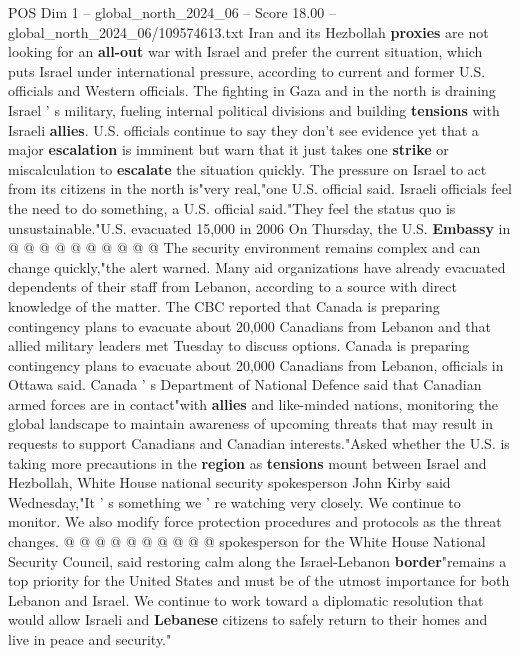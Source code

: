 \begin{textsample}{POS Dim 1 – global\_north\_2024\_06 – Score 18.00 – global\_north\_2024\_06/109574613.txt}
Iran and its Hezbollah \textbf{proxies} are not looking for an \textbf{all-out} war with Israel and prefer the current situation, which puts Israel under international pressure, according to current and former U.S. officials and Western officials.
The fighting in Gaza and in the north is draining Israel ' s military, fueling internal political divisions and building \textbf{tensions} with Israeli \textbf{allies}.
U.S. officials continue to say they don't see evidence yet that a major \textbf{escalation} is imminent but warn that it just takes one \textbf{strike} or miscalculation to \textbf{escalate} the situation quickly.
The pressure on Israel to act from its citizens in the north is"very real,"one U.S. official said.
Israeli officials feel the need to do something, a U.S. official said."They feel the status quo is unsustainable."U.S. evacuated 15,000 in 2006 On Thursday, the U.S. \textbf{Embassy} in @ @ @ @ @ @ @ @ @ @ The security environment remains complex and can change quickly,"the alert warned.
Many aid organizations have already evacuated dependents of their staff from Lebanon, according to a source with direct knowledge of the matter.
The CBC reported that Canada is preparing contingency plans to evacuate about 20,000 Canadians from Lebanon and that allied military leaders met Tuesday to discuss options.
Canada is preparing contingency plans to evacuate about 20,000 Canadians from Lebanon, officials in Ottawa said.
Canada ' s Department of National Defence said that Canadian armed forces are in contact"with \textbf{allies} and like-minded nations, monitoring the global landscape to maintain awareness of upcoming threats that may result in requests to support Canadians and Canadian interests."Asked whether the U.S. is taking more precautions in the \textbf{region} as \textbf{tensions} mount between Israel and Hezbollah, White House national security spokesperson John Kirby said Wednesday,"It ' s something we ' re watching very closely.
We continue to monitor.
We also modify force protection procedures and protocols as the threat changes. @ @ @ @ @ @ @ @ @ @ spokesperson for the White House National Security Council, said restoring calm along the Israel-Lebanon \textbf{border}"remains a top priority for the United States and must be of the utmost importance for both Lebanon and Israel.
We continue to work toward a diplomatic resolution that would allow Israeli and \textbf{Lebanese} citizens to safely return to their homes and live in peace and security."

\end{textsample}
